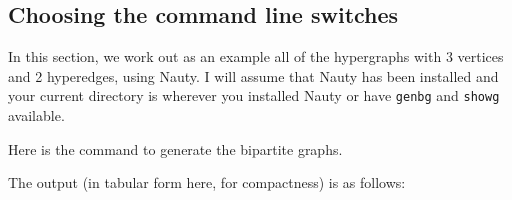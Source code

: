 \subsection{Choosing the command line switches}
\label{sec:nautycommandline}

In this section, we work out as an example all of the hypergraphs with 3 vertices and 2 hyperedges, using Nauty.
I will assume that Nauty has been installed and your current directory is wherever you installed Nauty or have \texttt{genbg} and \texttt{showg} available.

Here is the command to generate the bipartite graphs.


The output (in tabular form here, for compactness) is as follows:

